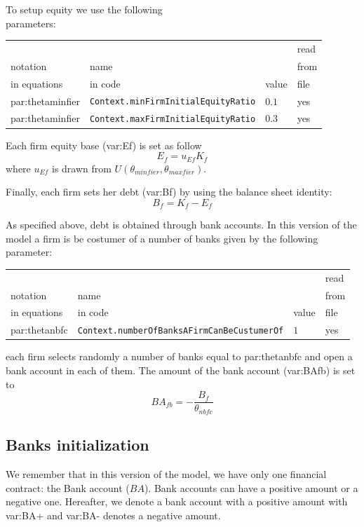 \documentclass{book}
\begin{document}
To setup equity we use the following\\
parameters:\\
\begin{tabular}{l l l l}
	\hline
	& &&read\\
	notation& name &&from\\
	in equations& in code&value&file\\
	\hline
	\hline
 \gls{par:thetaminfier}&\verb+Context.minFirmInitialEquityRatio+&$0.1$&yes\\
 \gls{par:thetaminfier}&\verb+Context.maxFirmInitialEquityRatio+&$0.3$&yes\\
	\hline
\end{tabular}

\vskip5mm
Each firm equity base (\gls{var:Ef}) is set as follow
\[
	E_f=u_{Ef}K_f
\]
where $u_{Ef}$ is drawn from $U(\theta_{minfier},\theta_{maxfier})$.

Finally, each firm sets her debt (\gls{var:Bf}) by using the balance sheet identity:
\[
B_f=K_f-E_f
\]

As specified above, debt is obtained through bank accounts.
In this version of the model a firm is be costumer of a number of banks given by the following\\
parameter:\\
\begin{tabular}{l l l l}
	\hline
	& &&read\\
	notation& name &&from\\
	in equations& in code&value&file\\
	\hline
	\hline
 \gls{par:thetanbfc}&\verb+Context.numberOfBanksAFirmCanBeCustumerOf+&$1$&yes\\
	\hline
\end{tabular}

\vskip5mm
each firm selects randomly a number of banks equal to \gls{par:thetanbfc} and open a bank account in each of them. The amount of the bank account (\gls{var:BAfb}) is set to
\[
	BA_{fb}=-\frac{B_f}{\theta_{nbfc}}
\]

\subsection{Banks initialization}
We remember that in this version of the model, we have only one financial contract: the Bank account ($BA$). Bank accounts can have a positive amount or a negative one. Hereafter, we denote a bank account with a positive amount with \gls{var:BA+} and \gls{var:BA-} denotes a negative amount.
\end{document}
